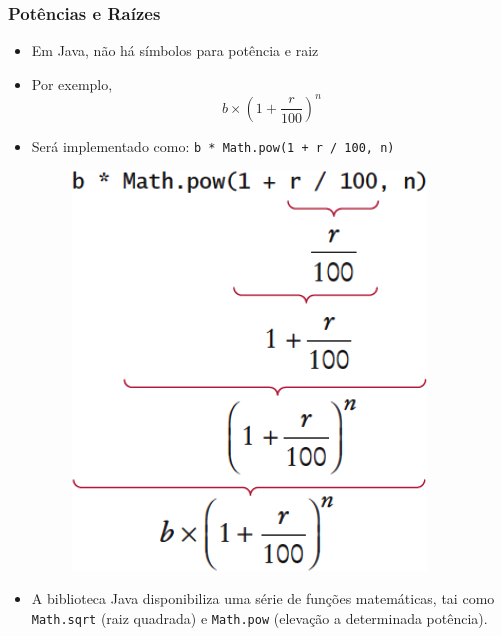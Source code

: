 \documentclass[xcolor={dvipsnames,table},aspectratio=169]{beamer}
\begin{document}
\begin{frame}\frametitle{Potências e Raízes}
\begin{itemize}
	\item Em Java, não há símbolos para potência e raiz
	\item Por exemplo, \[b \times \left(1+\frac{r}{100}\right)^n\]
	\item Será implementado como: \texttt{b * Math.pow(1 + r / 100, n)}
\begin{figure}[h]
	\includegraphics[height=0.3\paperheight,center]{pucrs-ep-fprog-unidade_02-tipos_de_dados_fundamentais-laminas-pow.png}
\end{figure}
	\item A biblioteca Java disponibiliza uma série de funções matemáticas, tai como \texttt{Math.sqrt} (raiz quadrada) e \texttt{Math.pow} (elevação a determinada potência).
\end{itemize}
\end{frame}
\end{document}
